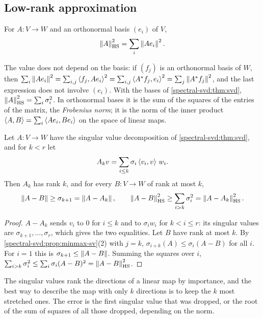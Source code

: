 \begin{notechapter}
\section{Low-rank approximation}\label{spectral-svd:sec:low-rank}

\begin{definition}\label{spectral-svd:def:hs}
For $A:V\to W$ and an orthonormal basis $(e_i)$ of $V$,
\[
  \left\|A\right\|_{\mathrm{HS}}^2 = \sum_i\left\|Ae_i\right\|^2 .
\]
\end{definition}

The value does not depend on the basis: if $(f_j)$ is an orthonormal basis
of $W$, then
$\sum_i\left\|Ae_i\right\|^2 = \sum_{i,j}\left\langle f_j, Ae_i \right\rangle^2
= \sum_{i,j}\left\langle A^{*}f_j, e_i \right\rangle^2 = \sum_j\left\|A^{*}f_j\right\|^2$, and the
last expression does not involve $(e_i)$. With the bases of
\cref{spectral-svd:thm:svd},
$\left\|A\right\|_{\mathrm{HS}}^2 = \sum_i\sigma_i^2$. In orthonormal bases it is
the sum of the squares of the entries of the matrix, the \emph{Frobenius
norm}; it is the norm of the inner product
$\left\langle A, B \right\rangle = \sum_i\left\langle Ae_i, Be_i \right\rangle$ on the space of linear maps.

\begin{theorem}\label{spectral-svd:thm:eckart-young}
Let $A:V\to W$ have the singular value decomposition of
\cref{spectral-svd:thm:svd}, and for $k < r$ let
\[
  A_kv = \sum_{i\leq k}\sigma_i\left\langle v_i, v \right\rangle\,w_i .
\]
Then $A_k$ has rank $k$, and for every $B:V\to W$ of rank at most $k$,
\[
  \left\|A - B\right\|\geq\sigma_{k+1} = \left\|A - A_k\right\| ,
  \qquad
  \left\|A - B\right\|_{\mathrm{HS}}^2\geq\sum_{i > k}\sigma_i^2
  = \left\|A - A_k\right\|_{\mathrm{HS}}^2 .
\]
\end{theorem}

\begin{proof}
$A - A_k$ sends $v_i$ to $0$ for $i\leq k$ and to $\sigma_iw_i$ for
$k < i\leq r$: its singular values are $\sigma_{k+1},\dots,\sigma_r$,
which gives the two equalities. Let $B$ have rank at most $k$. By
\cref{spectral-svd:prop:minmax-sv}(2) with $j = k$,
$\sigma_{i+k}(A)\leq\sigma_i(A - B)$ for all $i$. For $i = 1$ this is
$\sigma_{k+1}\leq\left\|A - B\right\|$. Summing the squares over $i$,
$\sum_{i > k}\sigma_i^2\leq\sum_i\sigma_i(A - B)^2
= \left\|A - B\right\|_{\mathrm{HS}}^2$.
\end{proof}

\begin{intuition}
The singular values rank the directions of a linear map by importance,
and the best way to describe the map with only $k$ directions is to keep
the $k$ most stretched ones. The error is the first singular value that
was dropped, or the root of the sum of squares of all those dropped,
depending on the norm.
\end{intuition}


\end{notechapter}
